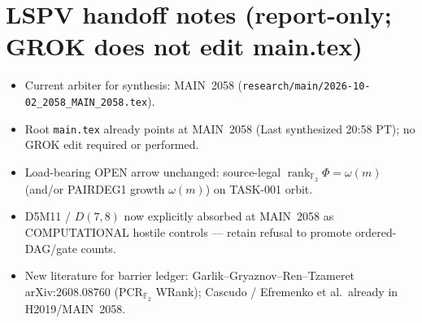 \documentclass[11pt]{article}
\begin{document}
\section*{LSPV handoff notes (report-only; GROK does not edit main.tex)}
\begin{itemize}
\item Current arbiter for synthesis: MAIN~2058
(\texttt{research/main/2026-10-02\_2058\_MAIN\_2058.tex}).
\item Root \texttt{main.tex} already points at MAIN~2058 (Last synthesized
20:58 PT); no GROK edit required or performed.
\item Load-bearing OPEN arrow unchanged: source-legal
$\operatorname{rank}_{\mathbb F_2}\Phi=\omega(m)$ (and/or PAIRDEG1 growth
$\omega(m)$) on TASK-001 orbit.
\item D5M11 / $D(7,8)$ now explicitly absorbed at MAIN~2058 as COMPUTATIONAL
hostile controls --- retain refusal to promote ordered-DAG/gate counts.
\item New literature for barrier ledger: Garlik--Gryaznov--Ren--Tzameret
arXiv:2608.08760 (PCR$_{\mathbb F_2}$ WRank); Cascudo / Efremenko et al.\ already
in H2019/MAIN~2058.
\end{itemize}

\end{document}
